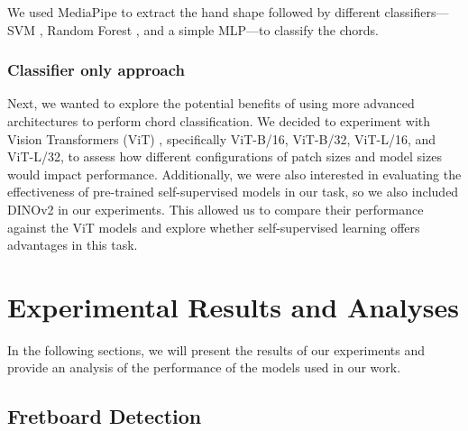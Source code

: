 \documentclass[10pt,twocolumn,letterpaper]{article}
\begin{document}
We used MediaPipe to extract the hand shape followed by different classifiers—SVM \cite{cortes1995support}, Random Forest \cite{ho1995random}, and a simple MLP—to classify the chords.

\subsubsection{Classifier only approach}
Next, we wanted to explore the potential benefits of using more advanced architectures to perform chord classification. We decided to experiment with Vision Transformers (ViT) \cite{dosovitskiy2020image}, specifically ViT-B/16, ViT-B/32, ViT-L/16, and ViT-L/32, to assess how different configurations of patch sizes and model sizes would impact performance. Additionally, we were also interested in evaluating the effectiveness of pre-trained self-supervised models in our task, so we also included DINOv2 \cite{oquab2023dinov2} in our experiments. This allowed us to compare their performance against the ViT models and explore whether self-supervised learning offers advantages in this task.

\section{Experimental Results and Analyses}
\label{sec:results}

In the following sections, we will present the results of our experiments and provide an analysis of the performance of the models used in our work.

\subsection{Fretboard Detection}
\end{document}
